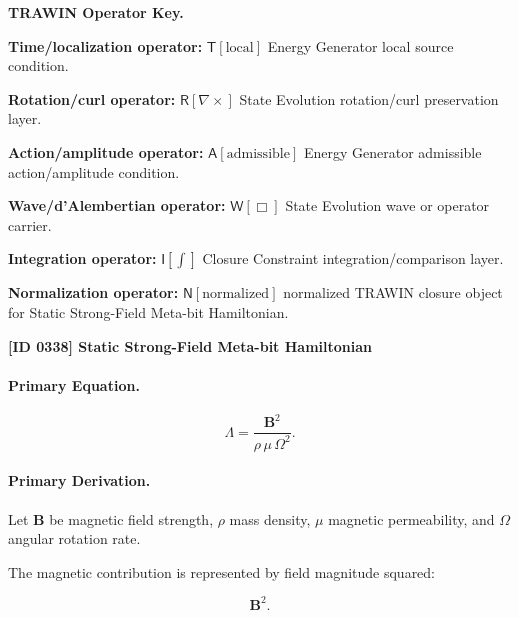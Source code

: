 \par\vspace{0.45\baselineskip}
\noindent\begin{minipage}[t]{\linewidth}
\begingroup
\small
\raggedright
\textbf{TRAWIN Operator Key.}\par
\noindent\textbf{Time/localization operator:} $\mathsf{T}\!\left[\mathrm{local}\right]$ Energy Generator local source condition.\par
\noindent\textbf{Rotation/curl operator:} $\mathsf{R}\!\left[\nabla\times\right]$ State Evolution rotation/curl preservation layer.\par
\noindent\textbf{Action/amplitude operator:} $\mathsf{A}\!\left[\mathrm{admissible}\right]$ Energy Generator admissible action/amplitude condition.\par
\noindent\textbf{Wave/d'Alembertian operator:} $\mathsf{W}\!\left[\Box\right]$ State Evolution wave or operator carrier.\par
\noindent\textbf{Integration operator:} $\mathsf{I}\!\left[\int\right]$ Closure Constraint integration/comparison layer.\par
\noindent\textbf{Normalization operator:} $\mathsf{N}\!\left[\mathrm{normalized}\right]$ normalized TRAWIN closure object for Static Strong-Field Meta-bit Hamiltonian.\par
\endgroup
\end{minipage}

\clearpage
\noindent\textbf{[ID 0338] Static Strong-Field Meta-bit Hamiltonian}\par
\vspace{0.35em}
\paragraph{Primary Equation.}
\begin{equation}
\Lambda
=
\frac{\mathbf{B}^2}
{\rho\,\mu\,\Omega^2}.
\end{equation}

\paragraph{Primary Derivation.}
Let $\mathbf{B}$ be magnetic field strength, $\rho$ mass density, $\mu$ magnetic permeability, and $\Omega$ angular rotation rate.

The magnetic contribution is represented by field magnitude squared:

\begin{equation}
\mathbf{B}^2 .
\end{equation}

